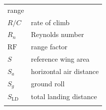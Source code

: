 \documentclass[
]{book}
\begin{document}
\begin{longtable}[]{@{}ll@{}}
\begin{minipage}[t]{0.80\columnwidth}
range\strut
\end{minipage}\tabularnewline
\begin{minipage}[t]{0.14\columnwidth}\raggedright
\(R/C\)\strut
\end{minipage} & \begin{minipage}[t]{0.80\columnwidth}\raggedright
rate of climb\strut
\end{minipage}\tabularnewline
\begin{minipage}[t]{0.14\columnwidth}\raggedright
\(R_n\)\strut
\end{minipage} & \begin{minipage}[t]{0.80\columnwidth}\raggedright
Reynolds number\strut
\end{minipage}\tabularnewline
\begin{minipage}[t]{0.14\columnwidth}\raggedright
\(\mathrm{RF}\)\strut
\end{minipage} & \begin{minipage}[t]{0.80\columnwidth}\raggedright
range factor\strut
\end{minipage}\tabularnewline
\begin{minipage}[t]{0.14\columnwidth}\raggedright
\(S\)\strut
\end{minipage} & \begin{minipage}[t]{0.80\columnwidth}\raggedright
reference wing area\strut
\end{minipage}\tabularnewline
\begin{minipage}[t]{0.14\columnwidth}\raggedright
\(S_a\)\strut
\end{minipage} & \begin{minipage}[t]{0.80\columnwidth}\raggedright
horizontal air distance\strut
\end{minipage}\tabularnewline
\begin{minipage}[t]{0.14\columnwidth}\raggedright
\(S_g\)\strut
\end{minipage} & \begin{minipage}[t]{0.80\columnwidth}\raggedright
ground roll\strut
\end{minipage}\tabularnewline
\begin{minipage}[t]{0.14\columnwidth}\raggedright
\(S_{\mathrm{LD}}\)\strut
\end{minipage} & \begin{minipage}[t]{0.80\columnwidth}\raggedright
total landing distance\strut
\end{minipage}\tabularnewline
\begin{minipage}[t]{0.14\columnwidth}\raggedright

\end{minipage}
\end{longtable}
\end{document}
